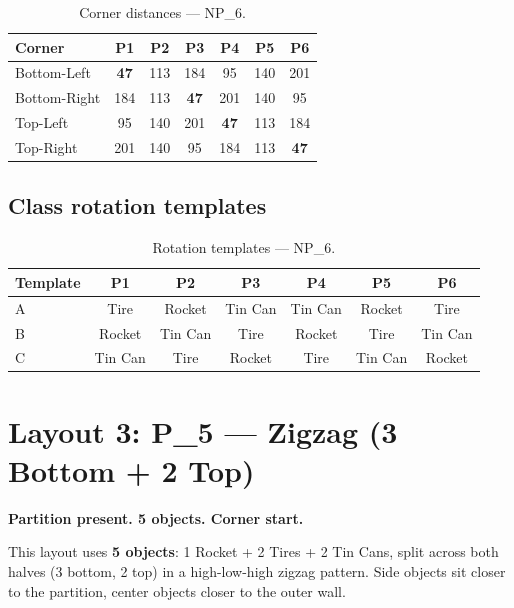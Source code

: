 \documentclass[a4]{article}
\begin{document}
\begin{table}[H]
\centering
\begin{tabular}{lcccccc}
\toprule
\textbf{Corner} & \textbf{P1} & \textbf{P2} & \textbf{P3} & \textbf{P4} & \textbf{P5} & \textbf{P6} \\
\midrule
Bottom-Left & \textbf{47} & 113 & 184 & 95 & 140 & 201 \\
Bottom-Right & 184 & 113 & \textbf{47} & 201 & 140 & 95 \\
Top-Left & 95 & 140 & 201 & \textbf{47} & 113 & 184 \\
Top-Right & 201 & 140 & 95 & 184 & 113 & \textbf{47} \\
\bottomrule
\end{tabular}
\caption{Corner distances --- NP\_6.}
\end{table}

\subsection*{Class rotation templates}

\begin{table}[H]
\centering
\begin{tabular}{lcccccc}
\toprule
\textbf{Template} & \textbf{P1} & \textbf{P2} & \textbf{P3} & \textbf{P4} & \textbf{P5} & \textbf{P6} \\
\midrule
A & Tire & Rocket & Tin Can & Tin Can & Rocket & Tire \\
B & Rocket & Tin Can & Tire & Rocket & Tire & Tin Can \\
C & Tin Can & Tire & Rocket & Tire & Tin Can & Rocket \\
\bottomrule
\end{tabular}
\caption{Rotation templates --- NP\_6.}
\end{table}

\pagebreak
\section*{Layout 3: P\_5 --- Zigzag (3 Bottom + 2 Top)}

\textbf{Partition present. 5 objects. Corner start.}

This layout uses \textbf{5 objects}: 1 Rocket + 2 Tires + 2 Tin Cans, split across both halves (3 bottom, 2 top) in a high-low-high zigzag pattern. Side objects sit closer to the partition, center objects closer to the outer wall.
\end{document}
